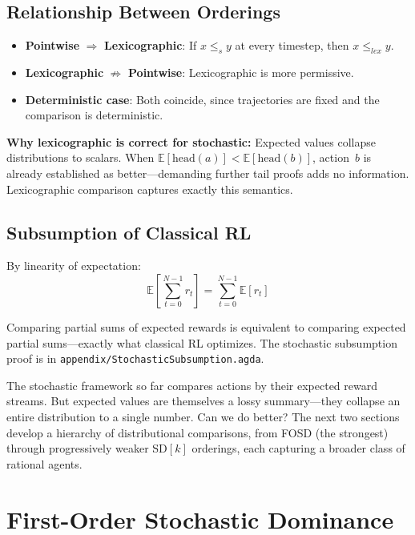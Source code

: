 \documentclass[9pt,a4paper]{article}
\newcommand{\fpath}[1]{\nolinkurl{#1}}
\theoremstyle{plain}
\theoremstyle{definition}
\theoremstyle{remark}
\begin{document}
\subsection{Relationship Between Orderings}

\begin{itemize}
\item \textbf{Pointwise} $\Rightarrow$ \textbf{Lexicographic}: If $x \le_s y$ at every timestep, then $x \le_{lex} y$.
\item \textbf{Lexicographic} $\not\Rightarrow$ \textbf{Pointwise}: Lexicographic is more permissive.
\item \textbf{Deterministic case}: Both coincide, since trajectories are fixed and the comparison is deterministic.
\end{itemize}

\noindent\textbf{Why lexicographic is correct for stochastic:} Expected values collapse distributions to scalars.  When $\mathbb{E}[\text{head}(a)] < \mathbb{E}[\text{head}(b)]$, action~$b$ is already established as better---demanding further tail proofs adds no information.  Lexicographic comparison captures exactly this semantics.

\subsection{Subsumption of Classical RL}

By linearity of expectation:
\[
\mathbb{E}\left[\sum_{t=0}^{N-1} r_t\right] = \sum_{t=0}^{N-1} \mathbb{E}[r_t]
\]

\noindent Comparing partial sums of expected rewards is equivalent to comparing expected partial sums---exactly what classical RL optimizes.  The stochastic subsumption proof is in \fpath{appendix/StochasticSubsumption.agda}.

The stochastic framework so far compares actions by their expected reward streams.  But expected values are themselves a lossy summary---they collapse an entire distribution to a single number.  Can we do better?  The next two sections develop a hierarchy of distributional comparisons, from FOSD (the strongest) through progressively weaker SD$[k]$ orderings, each capturing a broader class of rational agents.

\section{First-Order Stochastic Dominance}\label{sec:fosd}
\end{document}
